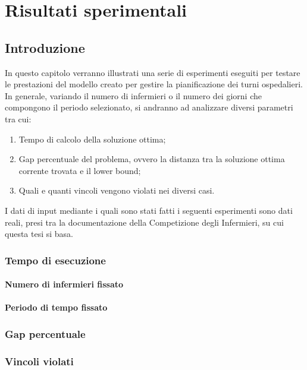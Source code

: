 \chapter{Risultati sperimentali}\label{ch:chapter3}

\section{Introduzione}
In questo capitolo verranno illustrati una serie di esperimenti eseguiti per testare le prestazioni del modello creato per gestire la pianificazione dei turni ospedalieri.
In generale, variando il numero di infermieri o il numero dei giorni che compongono il periodo selezionato, si andranno ad analizzare diversi parametri tra cui:
\begin{enumerate}
\item Tempo di calcolo della soluzione ottima;
\item Gap percentuale del problema, ovvero la distanza tra la soluzione ottima corrente trovata e il lower bound;
\item Quali e quanti vincoli vengono violati nei diversi casi.
\end{enumerate}

I dati di input mediante i quali sono stati fatti i seguenti esperimenti sono dati reali, presi tra la documentazione della Competizione degli Infermieri, su cui questa tesi si basa.

\subsection{Tempo di esecuzione}

\subsubsection*{Numero di infermieri fissato}

\subsubsection*{Periodo di tempo fissato}

\subsection{Gap percentuale}


\subsection{Vincoli violati}
